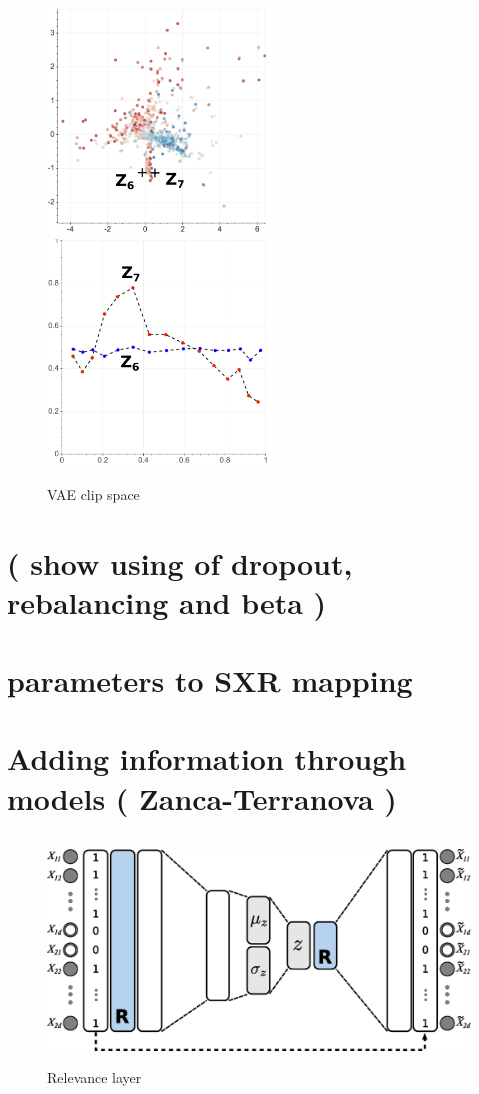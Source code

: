 \begin{figure}
    \includegraphics[height=6cm]{img/6_T_Hunch/ls_beta_clip_tcentro_67.png}
    \includegraphics[height=6cm]{img/6_T_Hunch/ls_beta_clip_tcentro_67_g.png}
    \caption{VAE clip space}
    \label{fig:my_label}
\end{figure}

\section{( show using of dropout, rebalancing and beta )}






\section{parameters to SXR mapping}



\section{Adding information through models ( Zanca-Terranova )}


\begin{figure}
    \centering
    \includegraphics[height=6cm]{img/STEP12_7/VAE_RELEVANCE.eps}
    \caption{Relevance layer}
    \label{fig:my_label}
\end{figure}

